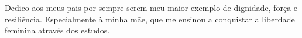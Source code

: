 \begin{dedicatoria}
   \vspace*{\fill}

{%
	\noindent\hspace{.5\textwidth}
	{\begin{minipage}{.5\textwidth}
			\begin{flushleft}
			Dedico aos meus pais por sempre serem meu maior exemplo de dignidade, força e resiliência. Especialmente à minha mãe, que me ensinou a conquistar a liberdade feminina através dos estudos. 
			\end{flushleft}
	\end{minipage}}%
\vspace*{3cm}
}%

\end{dedicatoria}
